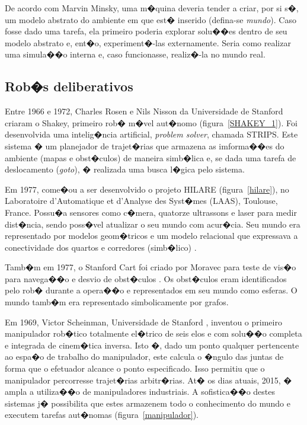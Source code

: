 De acordo com Marvin Minsky, uma m�quina deveria tender a criar, por si s�, um
modelo abstrato do ambiente em que est� inserido (defina-se \emph{mundo}).
Caso fosse dado uma tarefa, ela primeiro poderia explorar solu��es dentro de seu modelo abstrato e, ent�o,
experiment�-las externamente. Seria como realizar uma simula��o interna
e, caso funcionasse, realiz�-la no mundo real.

\subsection{Rob�s deliberativos}
Entre 1966 e 1972, Charles Rosen e Nils Nisson da Universidade de Stanford
criaram o Shakey, primeiro rob� m�vel aut�nomo (figura~\ref{SHAKEY_1}). Foi
desenvolvida uma intelig�ncia artificial, \textit{problem solver}, chamada
STRIPS. Este sistema � um planejador de trajet�rias que armazena as imforma��es
do ambiente (mapas e obst�culos) de maneira simb�lica e, se dada uma tarefa de
deslocamento (\textit{goto}), � realizada uma busca l�gica pelo sistema.

Em 1977, come�ou a ser desenvolvido o projeto HILARE (figura~\ref{hilare}), no
Laboratoire d'Automatique et d'Analyse des Syst�mes (LAAS), Toulouse, France. Possu�a sensores como c�mera, quatorze ultrassons e laser para
medir dist�ncia, sendo poss�vel atualizar o seu mundo com acur�cia. Seu mundo
era representado por modelos geom�tricos e um modelo relacional que expressava a
conectividade dos quartos e corredores (simb�lico) \cite{norelis1989control}.

Tamb�m em 1977, o Stanford Cart foi criado por Moravec para teste de vis�o
para navega��o e desvio de obst�culos \cite{moravec1977towards}. Os obst�culos
eram identificados pelo rob� durante a opera��o e representados em seu mundo
como esferas. O mundo tamb�m era representado simbolicamente por grafos.

Em 1969, Victor Scheinman, Universidade de Stanford
\cite{scheinman1969design}, inventou o primeiro manipulador rob�tico
totalmente el�trico de seis elos e com solu��o completa e integrada de
cinem�tica inversa. Isto �, dado um ponto qualquer pertencente ao espa�o de
trabalho do manipulador, este calcula o �ngulo das juntas de forma que o
efetuador alcance o ponto especificado. Isso permitiu que o manipulador
percorresse trajet�rias arbitr�rias. At� os dias atuais, 2015, � ampla a
utiliza��o de manipuladores industriais. A sofistica��o destes sistemas j�
possibilita que estes armazenem todo o conhecimento do mundo e executem tarefas
aut�nomas (figura~\ref{manipulador}).

